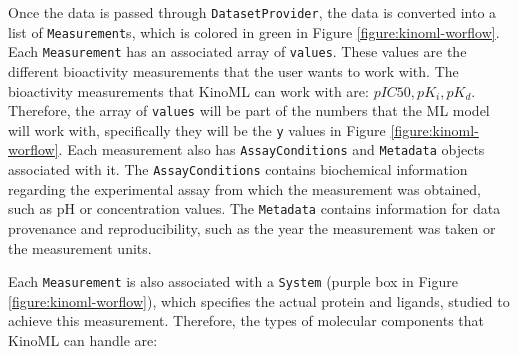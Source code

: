 \documentclass[9pt,lessons]{livecoms}
\begin{document}
Once the data is passed through \texttt{DatasetProvider}, the data is converted into a list of \texttt{Measurement}s, which is colored in green in Figure \ref{figure:kinoml-worflow}. Each \texttt{Measurement} has an associated array of \texttt{values}. These values are the different bioactivity measurements that the user wants to work with. The bioactivity measurements that KinoML can work with are: $pIC50, pK_{i}, pK_{d}$. Therefore, the array of \texttt{values} will be part of the numbers that the ML model will work with, specifically they will be the \texttt{y} values in Figure \ref{figure:kinoml-worflow}. Each measurement also has \texttt{AssayConditions} and \texttt{Metadata} objects associated with it. The \texttt{AssayConditions} contains biochemical information regarding the experimental assay from which the measurement was obtained, such as pH or concentration values. The \texttt{Metadata} contains information for data provenance and reproducibility, such as the year the measurement was taken or the measurement units. 

Each \texttt{Measurement} is also associated with a \texttt{System} (purple box in Figure \ref{figure:kinoml-worflow}), which specifies the actual protein and ligands, studied to achieve this measurement. %
Therefore, the types of molecular components that KinoML can handle are: 
\end{document}
